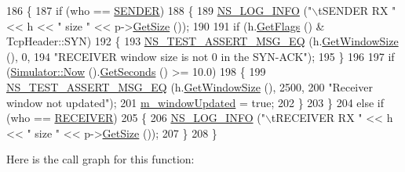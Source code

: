 \begin{DoxyCode}
186 \{
187   \textcolor{keywordflow}{if} (who == \hyperlink{classns3_1_1TcpGeneralTest_a29338e6b7137cad650c2ff835713f6eea5400e3d6b26928cf9e67ebb026462256}{SENDER})
188     \{
189       \hyperlink{group__logging_gafbd73ee2cf9f26b319f49086d8e860fb}{NS\_LOG\_INFO} (\textcolor{stringliteral}{"\(\backslash\)tSENDER RX "} << h << \textcolor{stringliteral}{" size "} << p->\hyperlink{classns3_1_1Packet_a462855c9929954d4301a4edfe55f4f1c}{GetSize} ());
190 
191       \textcolor{keywordflow}{if} (h.\hyperlink{classns3_1_1TcpHeader_a0d04c5620ee147d4e01d56b9530e8db1}{GetFlags} () & TcpHeader::SYN)
192         \{
193           \hyperlink{group__testing_ga2a9d78cffb3db8e867c35fff0b698cf5}{NS\_TEST\_ASSERT\_MSG\_EQ} (h.\hyperlink{classns3_1_1TcpHeader_aa6adcd54e5b13941acdf6328cecc9b29}{GetWindowSize} (), 0,
194                                  \textcolor{stringliteral}{"RECEIVER window size is not 0 in the SYN-ACK"});
195         \}
196 
197       \textcolor{keywordflow}{if} (\hyperlink{group__simulator_gac3635e2e87f7ce316c89290ee1b01d0d}{Simulator::Now} ().\hyperlink{classns3_1_1Time_a8f20d5c3b0902d7b4320982f340b57c8}{GetSeconds} () >= 10.0)
198         \{
199           \hyperlink{group__testing_ga2a9d78cffb3db8e867c35fff0b698cf5}{NS\_TEST\_ASSERT\_MSG\_EQ} (h.\hyperlink{classns3_1_1TcpHeader_aa6adcd54e5b13941acdf6328cecc9b29}{GetWindowSize} (), 2500,
200                                  \textcolor{stringliteral}{"Receiver window not updated"});
201           \hyperlink{classTcpZeroWindowTest_a29625fe07d920a3cb28a30e7f73ba500}{m\_windowUpdated} = \textcolor{keyword}{true};
202         \}
203     \}
204   \textcolor{keywordflow}{else} \textcolor{keywordflow}{if} (who == \hyperlink{classns3_1_1TcpGeneralTest_a29338e6b7137cad650c2ff835713f6eea2a9a39a8fe1edd25b643a48956b8ecff}{RECEIVER})
205     \{
206       \hyperlink{group__logging_gafbd73ee2cf9f26b319f49086d8e860fb}{NS\_LOG\_INFO} (\textcolor{stringliteral}{"\(\backslash\)tRECEIVER RX "} << h << \textcolor{stringliteral}{" size "} << p->\hyperlink{classns3_1_1Packet_a462855c9929954d4301a4edfe55f4f1c}{GetSize} ());
207     \}
208 \}
\end{DoxyCode}


Here is the call graph for this function\+:


